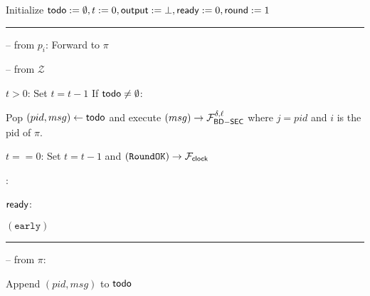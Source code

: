 \begin{bbox}[title={\textbf{Wrapper} $\mathcal{W}_{\msf{katz}} ( \pi )$}]

Initialize ${\mathsf {todo}} := \emptyset, t := 0, {\mathsf {output}} := \bot, {\mathsf {ready}} := 0, {\mathsf {round}} := 1$

\vspace{2mm} \hrule \vspace{2mm}

-- \OnInput {} from $p_i$:  Forward  to $\pi$

-- \OnInput {} from $\mathcal{Z}$

	\qquad \If $t > 0$: Set $t = t-1$  If ${\mathsf {todo}} \neq \emptyset$:

		\qqquad Pop $(pid, msg) \leftarrow {\mathsf {todo}}$ and execute \Send $(msg) \rightarrow \mathcal{F}_{{\mathsf {BD-SEC}}}^{\delta,\ell}$ where $j = pid$ and $i$ is the pid of $\pi$.

	\qquad \Else \If $t == 0$: Set $t = t-1$ and \Send $(\texttt{RoundOK}) \rightarrow \mathcal{F}_{{\mathsf {clock}}}$

	\qquad \Else:
	
		\qqquad \If ${\mathsf {ready}}$: \Output {}

		\qqquad \Else \Output $(\texttt{early})$

\vspace{2mm} \hrule \vspace{2mm}

-- \OnInput {} from $\pi$:

	\qquad Append $(pid, msg)$ to ${\mathsf {todo}}$

\end{bbox}

